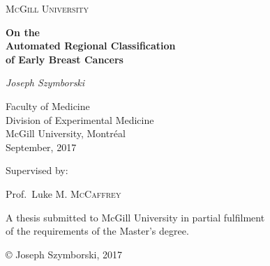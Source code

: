 \begin{titlepage}
	\centering
	\vspace{1cm}
	{\scshape\Large McGill University\par}
	\vspace{1.5cm}
	{\huge\bfseries On the\\Automated Regional Classification\\of Early Breast Cancers\par}
	\vspace{2cm}
	{\Large\itshape Joseph Szymborski\par}
	\vspace{1cm}
	{\large Faculty of Medicine\\
		Division of Experimental Medicine\\
		McGill University, Montréal\\
		September, 2017\par}
	\vspace{1.5cm}
	Supervised by:\par
	Prof.~Luke M. \textsc{McCaffrey}
	
	\vfill
	{A thesis submitted to McGill University in partial fulfilment\\of the requirements of the Master's degree.\par}
	\vfill

	{© Joseph Szymborski, 2017\par}
\end{titlepage}
